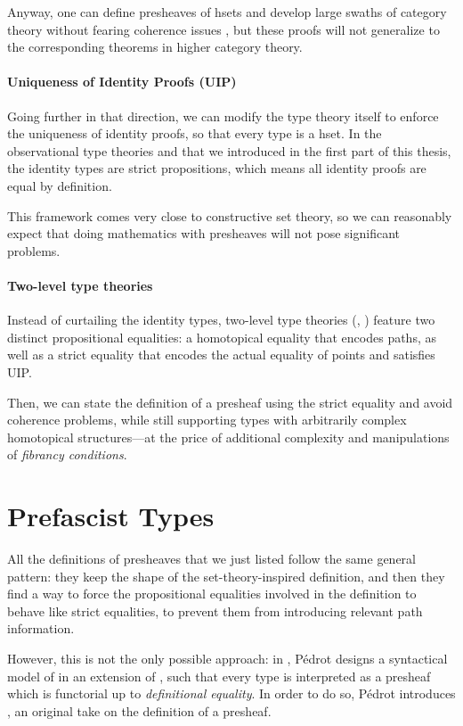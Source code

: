 Anyway, one can define presheaves of hsets and develop large swaths of category
theory without fearing coherence issues , but these proofs
will not generalize to the corresponding theorems in higher category theory.

\paragraph{Uniqueness of Identity Proofs (UIP)}
% 
Going further in that direction, we can modify the type theory itself to 
enforce the uniqueness of identity proofs, so that every type is a hset.
% 
In the observational type theories \SetoidTT and \SetoidCC that we introduced 
in the first part of this thesis, the identity types are strict propositions,
which means all identity proofs are equal by definition.

This framework comes very close to constructive set theory, so we can
reasonably expect that doing mathematics with presheaves will not pose 
significant problems.

\paragraph{Two-level type theories}
% 
Instead of curtailing the identity types, two-level type theories 
(, )
feature two distinct propositional equalities: a homotopical equality that 
encodes paths, as well as a strict equality that encodes the actual equality
of points and satisfies UIP.

Then, we can state the definition of a presheaf using the strict equality
and avoid coherence problems, while still supporting types with arbitrarily
complex homotopical structures---at the price of additional complexity
and manipulations of \emph{fibrancy conditions}.

\section{Prefascist Types}

All the definitions of presheaves that we just listed follow the same general
pattern: they keep the shape of the set-theory-inspired definition, and
then they find a way to force the propositional equalities involved in the
definition to behave like strict equalities, \ie to prevent them from 
introducing relevant path information. 

However, this is not the only possible approach: 
% 
in , Pédrot designs a syntactical model of \CIC in
an extension of \CIC, such that every type is interpreted as a presheaf which
is functorial up to \emph{definitional equality}. 
% 
In order to do so, Pédrot introduces , an original
take on the definition of a presheaf.

